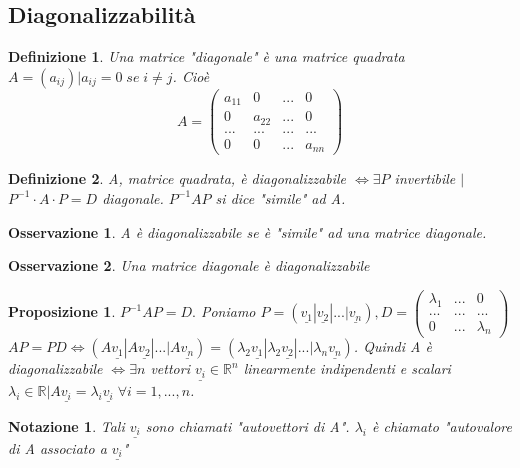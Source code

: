 \documentclass[12pt]{article}
\newenvironment{para}{\begin{adjustwidth}{13mm}{}}{\end{adjustwidth}}
\newtheorem{Definizione}{Definizione}[subsection]
\newtheorem{Proposizione}{Proposizione}[subsection]
\newtheorem{Notazione}{Notazione}[subsection]
\newtheorem{Osservazione}{Osservazione}[subsection]
\begin{document}
\begin{para}
\section{Diagonalizzabilità}
\begin{Definizione}
    Una matrice "diagonale" è una matrice quadrata \newline $A = (a_{ij})|a_{ij}=0 \; se \; i \neq j$. Cioè $$A = \begin{pmatrix}
        a_{11} & 0 & ... & 0 \\
        0 & a_{22} & ... & 0 \\
        ... & ... &... &...  \\
        0 & 0 & ... & a_{nn}
    \end{pmatrix}$$
\end{Definizione}
\begin{Definizione}
    A, matrice quadrata, è diagonalizzabile $\Leftrightarrow \exists P$ invertibile $|$ $P^{-1} \cdot A \cdot P = D$ diagonale. $P^{-1}AP$ si dice "simile" ad A. 
\end{Definizione}
\begin{Osservazione}
    A è diagonalizzabile se è "simile" ad una matrice diagonale.
\end{Osservazione}
\begin{Osservazione}
    Una matrice diagonale è diagonalizzabile
\end{Osservazione}
\begin{Proposizione}
    $P^{-1}AP= D.$ Poniamo $P = (\underline{v_1} | \underline{v_2} |...| \underline{v_n}), D = \begin{pmatrix}
        \lambda_1 & ... & 0 \\
        ... & ... & ... \\
        0 & ... & \lambda_n
    \end{pmatrix}$
\newline $AP = PD \Leftrightarrow (A\underline{v_1}|A\underline{v_2}|...|A\underline{v_n}) = (\lambda_2\underline{v_1}|\lambda_2\underline{v_2}|...|\lambda_n\underline{v_n})$. Quindi A è diagonalizzabile $\Leftrightarrow \exists n$ vettori $\underline{v_i}\in \mathbb{R}^n$ linearmente indipendenti e scalari $\lambda_i \in \mathbb{R} | A\underline{v_i} = \lambda_i\underline{v_i} \; \forall i = 1,...,n$.
\end{Proposizione}
\begin{Notazione}
    Tali $\underline{v_i}$ sono chiamati "autovettori di A". \newline
    $\lambda_i$ è chiamato "autovalore di A associato a $\underline{v_i}$"

\end{Notazione}
\end{para}
\end{document}

